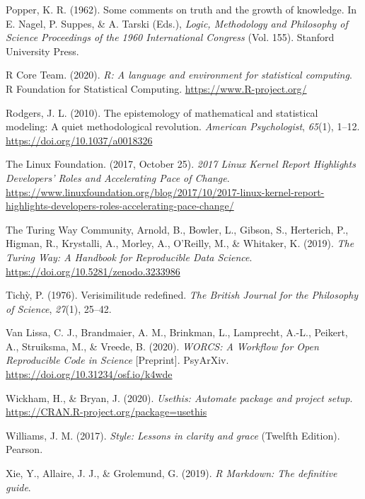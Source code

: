 \documentclass[12pt,a4paper,]{article}
\begin{document}
\leavevmode\hypertarget{ref-popperCommentsTruthGrowth1962}{}%
Popper, K. R. (1962). Some comments on truth and the growth of knowledge. In E. Nagel, P. Suppes, \& A. Tarski (Eds.), \emph{Logic, Methodology and Philosophy of Science Proceedings of the 1960 International Congress} (Vol. 155). Stanford University Press.

\leavevmode\hypertarget{ref-R-base}{}%
R Core Team. (2020). \emph{R: A language and environment for statistical computing}. R Foundation for Statistical Computing. \url{https://www.R-project.org/}

\leavevmode\hypertarget{ref-rodgersEpistemologyMathematicalStatistical2010}{}%
Rodgers, J. L. (2010). The epistemology of mathematical and statistical modeling: A quiet methodological revolution. \emph{American Psychologist}, \emph{65}(1), 1--12. \url{https://doi.org/10.1037/a0018326}

\leavevmode\hypertarget{ref-thelinuxfoundation2017LinuxKernel2017}{}%
The Linux Foundation. (2017, October 25). \emph{2017 Linux Kernel Report Highlights Developers' Roles and Accelerating Pace of Change}. \url{https://www.linuxfoundation.org/blog/2017/10/2017-linux-kernel-report-highlights-developers-roles-accelerating-pace-change/}

\leavevmode\hypertarget{ref-theturingwaycommunityTuringWayHandbook2019}{}%
The Turing Way Community, Arnold, B., Bowler, L., Gibson, S., Herterich, P., Higman, R., Krystalli, A., Morley, A., O'Reilly, M., \& Whitaker, K. (2019). \emph{The Turing Way: A Handbook for Reproducible Data Science}. \url{https://doi.org/10.5281/zenodo.3233986}

\leavevmode\hypertarget{ref-tichyVerisimilitudeRedefined1976}{}%
Tichỳ, P. (1976). Verisimilitude redefined. \emph{The British Journal for the Philosophy of Science}, \emph{27}(1), 25--42.

\leavevmode\hypertarget{ref-vanlissaWORCSWorkflowOpen2020}{}%
Van Lissa, C. J., Brandmaier, A. M., Brinkman, L., Lamprecht, A.-L., Peikert, A., Struiksma, M., \& Vreede, B. (2020). \emph{WORCS: A Workflow for Open Reproducible Code in Science} {[}Preprint{]}. PsyArXiv. \url{https://doi.org/10.31234/osf.io/k4wde}

\leavevmode\hypertarget{ref-R-usethis}{}%
Wickham, H., \& Bryan, J. (2020). \emph{Usethis: Automate package and project setup}. \url{https://CRAN.R-project.org/package=usethis}

\leavevmode\hypertarget{ref-williamsStyleLessonsClarity2017}{}%
Williams, J. M. (2017). \emph{Style: Lessons in clarity and grace} (Twelfth Edition). Pearson.

\leavevmode\hypertarget{ref-xieMarkdownDefinitiveGuide2019}{}%
Xie, Y., Allaire, J. J., \& Grolemund, G. (2019). \emph{R Markdown: The definitive guide}.
\end{document}
